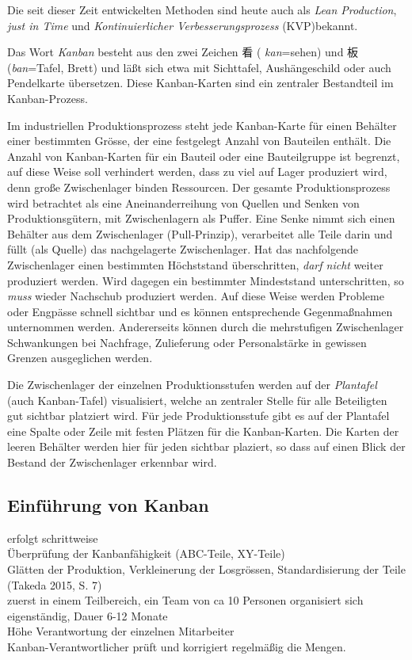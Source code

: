 Die seit dieser Zeit entwickelten Methoden sind heute auch als 
\emph{Lean Production}, \emph{just in Time} und 
\emph{Kontinuierlicher Verbesserungsprozess} (KVP)bekannt.

Das Wort \emph{Kanban} besteht aus den zwei Zeichen {\CN 看} ( \emph{kan}=sehen)
 und {\CN 板} (\emph{ban}=Tafel, Brett) und läßt sich etwa mit Sichttafel, 
 Aushängeschild oder auch Pendelkarte übersetzen.
Diese Kanban-Karten sind ein zentraler Bestandteil im Kanban-Prozess.

Im industriellen Produktionsprozess steht jede Kanban-Karte für einen Behälter einer bestimmten Grösse, der eine festgelegt Anzahl von Bauteilen enthält.
Die Anzahl von Kanban-Karten für ein Bauteil oder eine Bauteilgruppe ist begrenzt, auf diese Weise soll verhindert werden, dass zu viel auf Lager produziert wird, denn große Zwischenlager binden Ressourcen.
Der gesamte Produktionsprozess wird betrachtet als eine Aneinanderreihung von Quellen und Senken von Produktionsgütern, mit Zwischenlagern als Puffer.
Eine Senke nimmt sich einen Behälter aus dem Zwischenlager (Pull-Prinzip), verarbeitet alle Teile darin und füllt (als Quelle) das nachgelagerte Zwischenlager.
Hat das nachfolgende Zwischenlager einen bestimmten Höchststand überschritten, \emph{darf nicht} weiter produziert werden.
Wird dagegen ein bestimmter Mindeststand unterschritten, so \emph{muss} wieder Nachschub produziert werden.
Auf diese Weise werden Probleme oder Engpässe schnell sichtbar und es können entsprechende Gegenmaßnahmen unternommen werden.
Andererseits können durch die mehrstufigen Zwischenlager Schwankungen bei Nachfrage, Zulieferung oder Personalstärke in gewissen Grenzen ausgeglichen werden.

Die Zwischenlager der einzelnen Produktionsstufen werden auf der \emph{Plantafel} (auch Kanban-Tafel) visualisiert, welche an zentraler Stelle für alle Beteiligten gut sichtbar platziert wird.
Für jede Produktionsstufe gibt es auf der Plantafel eine Spalte oder Zeile mit festen Plätzen für die Kanban-Karten.
Die Karten der leeren Behälter werden hier für jeden sichtbar plaziert, so dass auf einen Blick der Bestand der Zwischenlager erkennbar wird.


\subsection{Einführung von Kanban}
erfolgt schrittweise\\
Überprüfung der Kanbanfähigkeit (ABC-Teile, XY-Teile)\\
Glätten der Produktion, Verkleinerung der Losgrössen, Standardisierung der Teile (Takeda 2015, S. 7)\\
zuerst in einem Teilbereich, ein Team von ca 10 Personen organisiert sich eigenständig, Dauer 6-12 Monate\\
Höhe Verantwortung der einzelnen Mitarbeiter\\
Kanban-Verantwortlicher prüft und korrigiert regelmäßig die Mengen.\\

